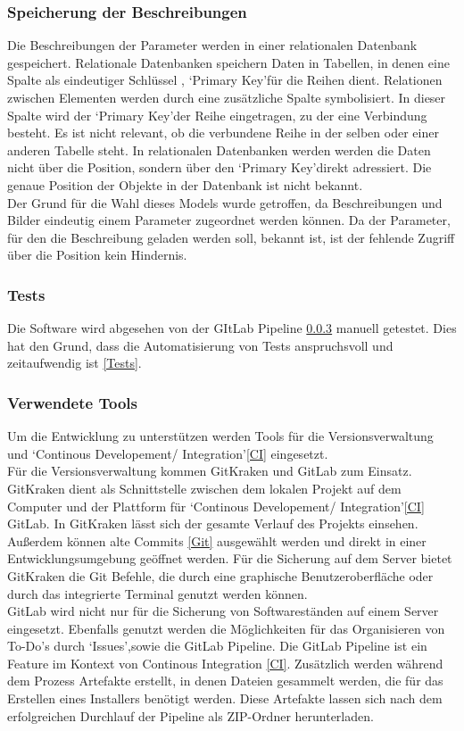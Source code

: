 \documentclass[12pt,a4paper]{article}
\begin{document}
\subsubsection{Speicherung der Beschreibungen}
Die Beschreibungen der Parameter werden in einer relationalen Datenbank gespeichert. Relationale Datenbanken speichern Daten in Tabellen, in denen eine Spalte als eindeutiger Schlüssel , \lq Primary Key\rq\space für die Reihen dient. Relationen zwischen Elementen werden durch eine zusätzliche Spalte symbolisiert. In dieser Spalte wird der \lq Primary Key\rq\space der Reihe eingetragen, zu der eine Verbindung besteht. Es ist nicht relevant, ob die verbundene Reihe in der selben oder einer anderen Tabelle steht. In relationalen Datenbanken werden werden die Daten nicht über die Position, sondern über den \lq Primary Key\rq\space direkt adressiert. Die genaue Position der Objekte in der Datenbank ist nicht bekannt\cite{10.1145/1283920.1283937}.\\
Der Grund für die Wahl dieses Models wurde getroffen, da Beschreibungen und Bilder eindeutig einem Parameter zugeordnet werden können. Da der Parameter, für den die Beschreibung geladen werden soll, bekannt ist, ist der fehlende Zugriff über die Position kein Hindernis.
\subsubsection{Tests}
Die Software wird abgesehen von der GItLab Pipeline \ref{Tools} manuell getestet. Dies hat den Grund, dass die Automatisierung von Tests anspruchsvoll und zeitaufwendig ist \ref{Tests}.
\subsubsection{Verwendete Tools}
\label{Tools}
Um die Entwicklung zu unterstützen werden Tools für die Versionsverwaltung und \lq Continous Developement/ Integration\rq\space \ref{CI} eingesetzt.\\
Für die Versionsverwaltung kommen GitKraken und GitLab zum Einsatz. GitKraken dient als Schnittstelle zwischen dem lokalen Projekt auf dem Computer und der Plattform für \lq Continous Developement/ Integration\rq\space \ref{CI} GitLab. In GitKraken lässt sich der gesamte Verlauf des Projekts einsehen. Außerdem können alte Commits \ref{Git} ausgewählt werden und direkt in einer Entwicklungsumgebung geöffnet werden. Für die Sicherung auf dem Server bietet GitKraken die Git Befehle, die durch eine graphische Benutzeroberfläche oder durch das integrierte Terminal genutzt werden können.\\
GitLab wird nicht nur für die Sicherung von Softwareständen auf einem Server eingesetzt. Ebenfalls genutzt werden die Möglichkeiten für das Organisieren von To-Do's durch \lq Issues\rq ,\space sowie die GitLab Pipeline. Die GitLab Pipeline ist ein Feature im Kontext von Continous Integration \ref{CI}. Zusätzlich werden während dem Prozess Artefakte erstellt, in denen Dateien gesammelt werden, die für das Erstellen eines Installers benötigt werden. Diese Artefakte lassen sich nach dem erfolgreichen Durchlauf der Pipeline als ZIP-Ordner herunterladen.\\ 
\end{document}
